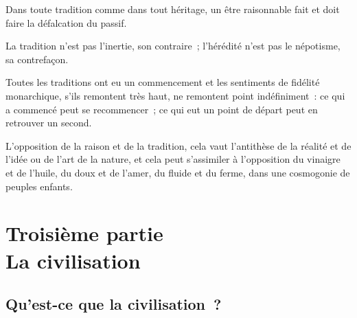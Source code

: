 \documentclass[french,twoside]{book} %
\newcommand{\astermono}{\medskip\centerline{\color{rubric}\large\selectfont{\syms ✻}}\medskip\par}%
\newcommand\chapteropen{} %
\newcommand\chaptercont{} %
\newcommand\chapterclose{} %
\begin{document}
\astermono

\noindent Dans toute tradition comme dans tout héritage, un être raisonnable fait et doit faire la défalcation du passif.\par

\astermono

\noindent La tradition n’est pas l’inertie, son contraire ; l’hérédité n’est pas le népotisme, sa contrefaçon.\par

\astermono

\noindent Toutes les traditions ont eu un commencement et les sentiments de fidélité monarchique, s’ils remontent très haut, ne remontent point indéfiniment : ce qui a commencé peut se recommencer ; ce qui eut un point de départ peut en retrouver un second.\par
L’opposition de la raison et de la tradition, cela vaut l’antithèse de la réalité et de l’idée ou de l’art de la nature, et cela peut s’assimiler à l’opposition du vinaigre et de l’huile, du doux et de l’amer, du fluide et du ferme, dans une cosmogonie de peuples enfants.
\chapterclose


\chapteropen
\chapter[{Troisième partie. La civilisation}]{Troisième partie \\
La civilisation}\renewcommand{\leftmark}{Troisième partie \\
La civilisation}


\chaptercont
\section[{Qu’est-ce que la civilisation ?}]{Qu’est-ce que la civilisation ?}
\end{document}
